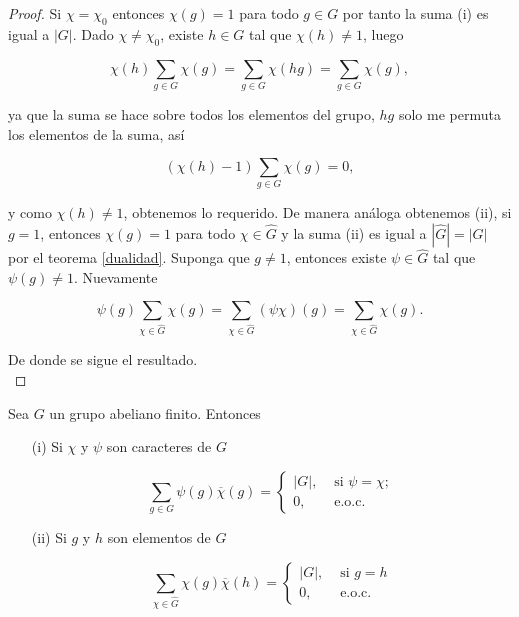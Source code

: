 \begin{proof}

Si $\chi=\chi_0$ entonces $\chi(g)=1$ para todo $g \in G$ por tanto la suma (i) es igual a $|G|$. Dado $\chi \neq \chi_0$, existe $h \in G$ tal que $\chi(h) \neq 1$, luego

$$
\chi(h) \sum_{g \in G} \chi(g)=\sum_{g \in G} \chi(h g)=\sum_{g \in G} \chi(g),
$$


ya que la  suma  se hace  sobre todos los elementos del grupo, $hg$ solo me permuta los elementos de la suma, así

$$(\chi(h)-1) \sum_{g\in G}\chi(g)=0,$$ 

y como $\chi(h) \neq 1$, obtenemos lo requerido. De manera  análoga obtenemos (ii), si $g=1$, entonces $\chi(g)=1$ para todo $\chi \in \widehat{G}$ y la suma (ii) es igual a $|\widehat{G}|=|G|$ por  el teorema \ref{dualidad}. Suponga que $g \neq 1$, entonces existe $\psi \in \widehat{G}$ tal que $\psi(g) \neq 1$. Nuevamente

$$
\psi(g) \sum_{\chi \in \widehat{G}} \chi(g)=\sum_{\chi \in \widehat{G}}(\psi \chi)(g)=\sum_{\chi \in \widehat{G}} \chi(g).
$$


De donde se sigue el resultado.\\
\end{proof}

\begin{corollary}[Ortogonalidad]

  Sea $G$ un grupo abeliano finito. Entonces

\begin{itemize}
    \item[(i)] Si $\chi$ y $\psi$ son caracteres de $G$

$$
\sum_{g \in G} \psi(g) \overline{\chi}(g)= \begin{cases}|G|, & \text { si } \psi=\chi ; \\ 0, & \text { e.o.c. }\end{cases}
$$

\item[(ii)] Si $g$ y $h$ son elementos de $G$

$$
\sum_{\chi \in \widehat{G}} \chi(g) \overline{\chi}(h)= \begin{cases}|G|, & \text { si } g=h \\ 0, & \text { e.o.c. }\end{cases}
$$
\end{itemize}

\end{corollary}

